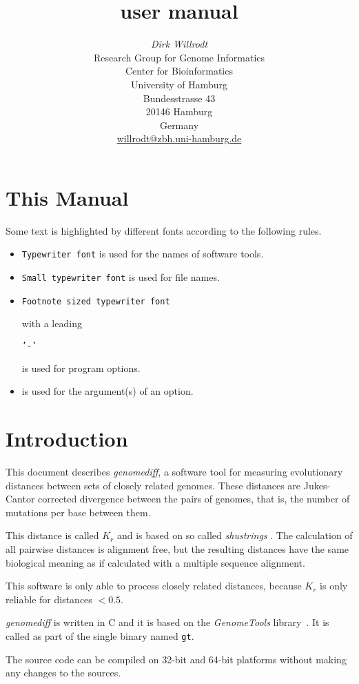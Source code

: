 \documentclass[12pt,titlepage]{article}
\title{\Gdiff user manual}
\author{\begin{tabular}{c}
  \textit{Dirk Willrodt}\\[1cm]
  Research Group for Genome Informatics\\
  Center for Bioinformatics\\
  University of Hamburg\\
  Bundesstrasse 43\\
  20146 Hamburg\\
  Germany\\[1cm]
  \url{willrodt@zbh.uni-hamburg.de}\\
\end{tabular}}
\newcommand{\Gdiff}{\textit{genomediff}\xspace}
\newcommand{\GenomeTools}{\textit{GenomeTools}\xspace}
\newcommand{\Gt}{\texttt{gt}\xspace}
\newcommand{\Kr}{\ensuremath{K_r}\xspace}
\newcommand{\File}[1]{\texttt{\small #1}}
\newcommand{\ShuS}{\textit{shustrings}\xspace}
\begin{document}
\maketitle

\section*{This Manual}
Some text is highlighted by different fonts according to the following rules.

\begin{itemize}
\item \texttt{Typewriter font} is used for the names of software tools.
\item \File{Small typewriter font} is used for file names.
\item \begin{footnotesize}\texttt{Footnote sized typewriter font}
      \end{footnotesize} with a leading
      \begin{footnotesize}\texttt{'-'}\end{footnotesize}
      is used for program options.
\item {} is used for the argument(s) of an
      option.
\end{itemize}


\section{Introduction}
This document describes \Gdiff, a software tool for measuring evolutionary
distances between sets of closely related genomes. These distances are
Jukes-Cantor corrected divergence between the pairs of genomes, that is, the
number of mutations per base between them.

This distance is called \Kr and is based on so called \ShuS
\cite{HAU:DOM:WIE:2008,HAU:PFA:DOM:WIE:2009,HAU:REE:PFA:2011}. The calculation
of all pairwise distances is alignment free, but the resulting distances have
the same biological meaning as if calculated with a multiple sequence alignment.

This software is only able to process closely related distances, because \Kr is
only reliable for distances $<0.5$.

\Gdiff is written in C and it is based on the \GenomeTools
library~\cite{genometools}. It is called as part of the single binary named \Gt.

The source code can be compiled on 32-bit and 64-bit platforms without making
any changes to the sources.
\end{document}
